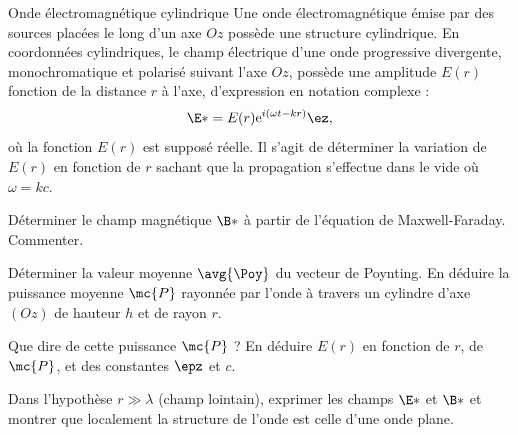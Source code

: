 \begin{exo}[PC][2][TD]{Onde électromagnétique cylindrique}
  Une onde électromagnétique émise par des sources placées le long d'un axe $O z$ possède une structure cylindrique. En coordonnées cylindriques, le champ électrique d'une onde progressive divergente, monochromatique et polarisé suivant l'axe $O z$, possède une amplitude $E(r)$ fonction de la distance $r$ à l'axe, d'expression
  en notation complexe : 
  \begin{equation}
  \E*=E(r) \mathrm{e}^{i(\omega t-k r)} \ez,
  \end{equation}
  où la fonction $E(r)$ est supposé réelle.
  Il s'agit de déterminer la variation de $E(r)$ en fonction de $r$ sachant que la propagation s'effectue dans le vide où $\omega = kc$.
  \begin{quest}	
    \item Déterminer le champ magnétique $\B*$ à partir de l'équation de Maxwell-Faraday. Commenter.
    \item Déterminer la valeur moyenne $\avg{\Poy}$ du vecteur de Poynting. En déduire la puissance moyenne $\mc{P}$ rayonnée par l'onde à travers un cylindre d'axe $(Oz)$ de hauteur $h$ et de rayon $r$.
    \item Que dire de cette puissance $\mc{P}$ ? En déduire $E(r)$ en fonction de $r$, de $\mc{P}$, et des constantes $\epz$ et $c$.
    \item Dans l'hypothèse $r \gg \lambda$ (champ lointain), exprimer les champs $\E*$ et $\B*$ et montrer que localement la structure de l'onde est celle d'une onde plane.
  \end{quest}
  
  

\end{exo}
